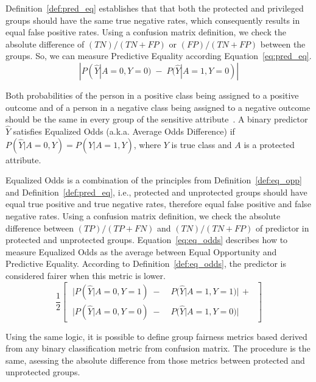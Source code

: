 Definition~\ref{def:pred_eq} establishes that that both the protected and privileged groups should have the same true negative rates, which consequently results in equal false positive rates. Using a confusion matrix definition, we check the absolute difference of $(TN)/(TN + FP)$ or $(FP)/(TN + FP)$ between the groups. So, we can measure Predictive Equality according Equation~\ref{eq:pred_eq}.
\begin{equation}\label{eq:pred_eq}
    |P(\hat{Y}|A=0,Y=0) \; - \; P(\hat{Y}|A=1,Y=0)|
\end{equation}

\begin{definition}\label{def:eq_odds}
Both probabilities of the person in a positive class being assigned to a positive outcome and of a person in a negative class being assigned to a negative outcome should be the same in every group of the sensitive attribute~\citep{Hardt2016}. A binary predictor $\hat{Y}$ satisfies Equalized Odds (a.k.a. Average Odds Difference) if $P(\hat{Y}|A=0,Y) = P(\hat{Y}|A=1,Y)$, where $Y$ is true class and $A$ is a protected attribute.
\end{definition}

Equalized Odds is a combination of the principles from Definition~\ref{def:eq_opp} and Definition~\ref{def:pred_eq}, i.e., protected and unprotected groups should have equal true positive and true negative rates, therefore equal false positive and false negative rates. Using a confusion matrix definition, we check the absolute difference between $(TP)/(TP + FN)$ and $(TN)/(TN + FP)$ of predictor in protected and unprotected groups. Equation~\ref{eq:eq_odds} describes how to measure Equalized Odds as the average between Equal Opportunity and Predictive Equality. According to Definition~\ref{def:eq_odds}, the predictor is considered fairer when this metric is lower.
\begin{equation}\label{eq:eq_odds}
    \frac{1}{2}\left[\;
    \begin{aligned}
    |P(\hat{Y}|A=0,Y=1)\;-\;&P(\hat{Y}|A=1,Y=1)| \, +\\
    |P(\hat{Y}|A=0,Y=0)\;-\;&P(\hat{Y}|A=1,Y=0)|
    \end{aligned}
    \;\right]
\end{equation}

Using the same logic, it is possible to define group fairness metrics based derived from any binary classification metric from confusion matrix. The procedure is the same, asessing the absolute difference from those metrics between protected and unprotected groups.


